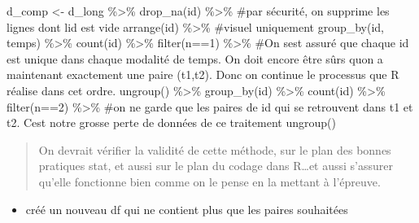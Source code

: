 \documentclass[
  letterpaper,
  DIV=11,
  numbers=noendperiod]{scrreprt}
\newenvironment{Shaded}{\begin{snugshade}}{\end{snugshade}}
\newcommand{\AttributeTok}[1]{\textcolor[rgb]{0.40,0.45,0.13}{#1}}
\newcommand{\CommentTok}[1]{\textcolor[rgb]{0.37,0.37,0.37}{#1}}
\newcommand{\DecValTok}[1]{\textcolor[rgb]{0.68,0.00,0.00}{#1}}
\newcommand{\FunctionTok}[1]{\textcolor[rgb]{0.28,0.35,0.67}{#1}}
\newcommand{\NormalTok}[1]{\textcolor[rgb]{0.00,0.23,0.31}{#1}}
\newcommand{\OtherTok}[1]{\textcolor[rgb]{0.00,0.23,0.31}{#1}}
\newcommand{\SpecialCharTok}[1]{\textcolor[rgb]{0.37,0.37,0.37}{#1}}
\newcommand{\StringTok}[1]{\textcolor[rgb]{0.13,0.47,0.30}{#1}}
\providecommand{\tightlist}{%
  \setlength{\itemsep}{0pt}\setlength{\parskip}{0pt}}\usepackage{longtable,booktabs,array}
\begin{document}
\begin{Shaded}
\begin{Highlighting}[]
\NormalTok{d\_comp }\OtherTok{\textless{}{-}}\NormalTok{ d\_long }\SpecialCharTok{\%\textgreater{}\%} 
  \FunctionTok{drop\_na}\NormalTok{(id) }\SpecialCharTok{\%\textgreater{}\%} \CommentTok{\#par sécurité, on supprime les lignes dont l\textquotesingle{}id est vide}
  \FunctionTok{arrange}\NormalTok{(id) }\SpecialCharTok{\%\textgreater{}\%} \CommentTok{\#visuel uniquement}
  \FunctionTok{group\_by}\NormalTok{(id, temps) }\SpecialCharTok{\%\textgreater{}\%} 
  \FunctionTok{count}\NormalTok{(id) }\SpecialCharTok{\%\textgreater{}\%} 
  \FunctionTok{filter}\NormalTok{(n}\SpecialCharTok{==}\DecValTok{1}\NormalTok{) }\SpecialCharTok{\%\textgreater{}\%} \CommentTok{\#On s\textquotesingle{}est assuré que chaque id est unique dans chaque modalité de temps. On doit encore être sûrs qu\textquotesingle{}on a maintenant exactement une paire (t1,t2). Donc on continue le processus que R réalise dans cet ordre.}
  \FunctionTok{ungroup}\NormalTok{() }\SpecialCharTok{\%\textgreater{}\%} 
  \FunctionTok{group\_by}\NormalTok{(id) }\SpecialCharTok{\%\textgreater{}\%} 
  \FunctionTok{count}\NormalTok{(id) }\SpecialCharTok{\%\textgreater{}\%} 
  \FunctionTok{filter}\NormalTok{(n}\SpecialCharTok{==}\DecValTok{2}\NormalTok{) }\SpecialCharTok{\%\textgreater{}\%} \CommentTok{\#on ne garde que les paires de id qui se retrouvent dans t1 et t2. C\textquotesingle{}est notre grosse perte de données de ce traitement}
  \FunctionTok{ungroup}\NormalTok{()}
\end{Highlighting}
\end{Shaded}

\begin{quote}
On devrait vérifier la validité de cette méthode, sur le plan des bonnes
pratiques stat, et aussi sur le plan du codage dans R\ldots et aussi
s'assurer qu'elle fonctionne bien comme on le pense en la mettant à
l'épreuve.
\end{quote}

\begin{itemize}
\tightlist
\item
  créé un nouveau df qui ne contient plus que les paires souhaitées
\end{itemize}

\begin{Shaded}
\end{Shaded}
\end{document}

